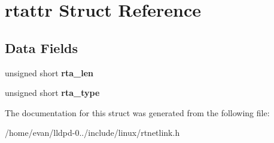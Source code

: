 \section{rtattr \-Struct \-Reference}
\label{structrtattr}
\subsection*{\-Data \-Fields}
\begin{DoxyCompactItemize}
\item 
unsigned short {\bfseries rta\-\_\-len}\label{structrtattr_a6f65b74d96717a26b2d796e567a2c9b0}

\item 
unsigned short {\bfseries rta\-\_\-type}\label{structrtattr_a4d6a35884f784025ee9059212d77b060}

\end{DoxyCompactItemize}


\-The documentation for this struct was generated from the following file\-:\begin{DoxyCompactItemize}
\item 
/home/evan/lldpd-\/0../include/linux/rtnetlink.\-h\end{DoxyCompactItemize}
